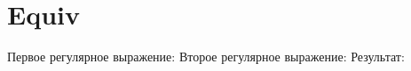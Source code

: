 \section{Equiv}
\begin{frame}{}
	Первое регулярное выражение:
	Второе регулярное выражение:
	Результат:
\end{frame}
